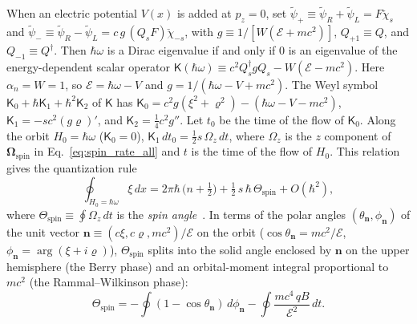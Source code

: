 \documentclass[aps,prd,onecolumn,tightenlines,nofootinbib,notitlepage,11pt,floatfix]{revtex4-2}
\theoremstyle{indentedtheorem}
\begin{document}
When an electric potential $V(x)$ is added at $p_z=0$, set $\tilde{\psi}_+ \equiv \tilde{\psi}_R+\tilde{\psi}_L = F\check{\chi}_s$ and $\tilde{\psi}_- \equiv \tilde{\psi}_R-\tilde{\psi}_L = c\,g\,(Q_s F)\check{\chi}_{-s}$, with $g \equiv 1/[W(\mathcal{E}+mc^2)]$, $Q_{+1}\equiv Q$, and $Q_{-1}\equiv Q^\dagger$. Then $\hbar\omega$ is a Dirac eigenvalue if and only if $0$ is an eigenvalue of the energy-dependent scalar operator $\mathsf{K}(\hbar\omega) \equiv c^2 Q_s^\dagger g Q_s - W(\mathcal{E}-mc^2)$. Here $\alpha_n=W=1$, so $\mathcal{E}=\hbar\omega-V$ and $g=1/(\hbar\omega-V+mc^2)$. The Weyl symbol $\mathsf{K}_0 + \hbar\mathsf{K}_1 + \hbar^2\mathsf{K}_2$ of $\mathsf{K}$ has $\mathsf{K}_0 = c^2 g(\xi^2+\varrho^2) - (\hbar\omega-V-mc^2)$, $\mathsf{K}_1 = -sc^2(g\varrho)'$, and $\mathsf{K}_2 = \tfrac{1}{4}c^2 g''$. Let $t_0$ be the time of the flow of $\mathsf{K}_0$. Along the orbit $H_0=\hbar\omega$ ($\mathsf{K}_0=0$), $\mathsf{K}_1\,dt_0 = \tfrac{1}{2}s\,\Omega_z\,dt$, where $\Omega_z$ is the $z$ component of $\boldsymbol{\Omega}_\text{spin}$ in Eq.~\eqref{eq:spin_rate_all} and $t$ is the time of the flow of $H_0$. This relation gives the quantization rule
\begin{equation}
    \oint_{H_0=\hbar\omega}\xi\,dx = 2\pi\hbar\,\big(n+\tfrac{1}{2}\big) + \tfrac{1}{2}\,s\,\hbar\,\Theta_\text{spin} + O(\hbar^2) ,
    \label{eq:rule_spin_angle}
\end{equation}
where $\Theta_\text{spin} \equiv \oint\Omega_z\,dt$ is the \emph{spin angle}~\citep{Keppeler2003Semiclassical,CarmierUllmo2008Berry,Fuchs2010Topological,BeckerFujiieWittsten2025Bohr}. In terms of the polar angles $(\theta_\mathbf{n},\phi_\mathbf{n})$ of the unit vector $\mathbf{n} \equiv (c\xi,c\varrho,mc^2)/\mathcal{E}$ on the orbit ($\cos\theta_\mathbf{n} = mc^2/\mathcal{E}$, $\phi_\mathbf{n} = \arg(\xi+i\varrho)$), $\Theta_\text{spin}$ splits into the solid angle enclosed by $\mathbf{n}$ on the upper hemisphere (the Berry phase) and an orbital-moment integral proportional to $mc^2$ (the Rammal--Wilkinson phase):
\begin{equation}
    \Theta_\text{spin} = -\oint(1-\cos\theta_\mathbf{n})\,d\phi_\mathbf{n} -\oint\frac{mc^4\,qB}{\mathcal{E}^2}\,dt .
    \label{eq:spin_angle_geom}
\end{equation}
\end{document}

